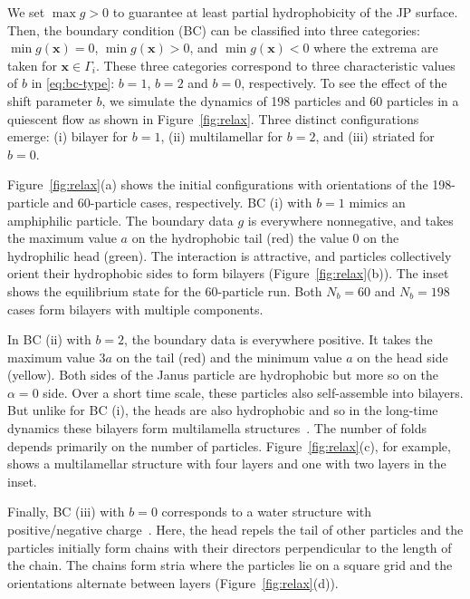\documentclass[prb,preprint,showpacs,preprintnumbers,amsmath,amssymb,longbibliography]{revtex4-1}
\newcommand{\xx}{\mathbf{x}}
\begin{document}
We set $\max g>0$ to guarantee at least partial hydrophobicity of the JP
surface.  Then, the boundary condition (BC) can be classified into three
categories: $\min g(\xx) = 0$, $\min g(\xx) >0$, and $\min g(\xx) <0$
where the extrema are taken for $\xx \in \Gamma_i$.  These three
categories correspond to three characteristic values of $b$ in
\eqref{eq:bc-type}: $b=1$, $b=2$ and $b=0$, respectively. 
%
To see the effect of the shift parameter $b$, we simulate the dynamics
of 198 particles and 60 particles in a quiescent flow as shown in
Figure~\ref{fig:relax}. Three distinct configurations emerge: (i)
bilayer for $b = 1$, (ii) multilamellar for $b = 2$, and (iii) striated
for $b = 0$.

Figure~\ref{fig:relax}(a) shows the initial configurations with
orientations of the 198-particle and 60-particle cases, respectively.
BC (i) with $b = 1$ mimics an amphiphilic particle. The boundary data
$g$ is everywhere nonnegative, and takes the maximum value $a$ on the
hydrophobic tail (red) the value $0$ on the hydrophilic head (green).
The interaction is attractive, and particles collectively orient their
hydrophobic sides to form bilayers (Figure~\ref{fig:relax}(b)). The
inset shows the equilibrium state for the 60-particle run. Both
$N_b = 60$ and $N_b = 198$ cases
form bilayers with multiple components.

In BC (ii) with $b = 2$, the boundary data is everywhere positive. It
takes the maximum value $3a$ on the tail (red) and the minimum value $a$
on the head side (yellow). Both sides of the Janus particle are
hydrophobic but more so on the $\alpha = 0$ side. Over a short time
scale, these particles also self-assemble into bilayers. But unlike for
BC (i), the heads are also hydrophobic and so in the long-time dynamics
these bilayers form multilamella structures~\cite{C9NR05885K}. The
number of folds depends primarily on the number of particles.
Figure~\ref{fig:relax}(c), for example, shows a multilamellar structure
with four layers and one with two layers in the inset.

Finally, BC (iii) with $b=0$ corresponds to a water structure with
positive/negative charge~\cite{MaRa76, Ma77}. Here, the head repels the
tail of other particles and the particles initially form chains with
their directors perpendicular to the length of the chain. The chains
form stria where the particles lie on a square grid and the orientations
alternate between layers (Figure~\ref{fig:relax}(d)).
\end{document}
